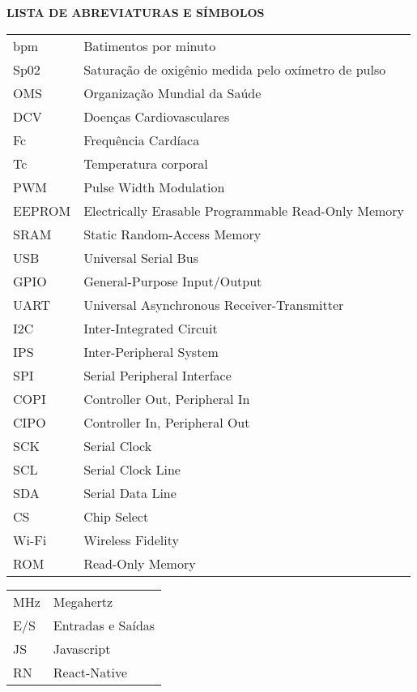 \centering \textbf{\large{LISTA DE ABREVIATURAS E SÍMBOLOS} }

\vspace{2 cm}
\justifying
\begin{tabular}{l l}
    bpm & Batimentos por minuto\\[10pt]
    Sp02 & Saturação de oxigênio medida pelo oxímetro de pulso\\[10pt]
    OMS & Organização Mundial da Saúde\\[10pt]
    DCV & Doenças Cardiovasculares\\[10pt]
    Fc & Frequência Cardíaca\\[10pt]
    Tc & Temperatura corporal\\[10pt]
    PWM & Pulse Width Modulation\\[10pt]
    EEPROM & Electrically Erasable Programmable Read-Only Memory\\[10pt]
    SRAM & Static Random-Access Memory\\[10pt]
    USB & Universal Serial Bus\\[10pt]
    GPIO & General-Purpose Input/Output\\[10pt]
    UART & Universal Asynchronous Receiver-Transmitter\\[10pt]
    I2C & Inter-Integrated Circuit\\[10pt]
    IPS & Inter-Peripheral System\\[10pt]
    SPI & Serial Peripheral Interface\\[10pt]
    COPI & Controller Out, Peripheral In\\[10pt]
    CIPO & Controller In, Peripheral Out\\[10pt]
    SCK & Serial Clock\\[10pt]
    SCL & Serial Clock Line\\[10pt]
    SDA & Serial Data Line\\[10pt]
    CS & Chip Select\\[10pt]
    Wi-Fi & Wireless Fidelity\\[10pt]
    ROM & Read-Only Memory\\[10pt]
\end{tabular}

\newpage
\begin{tabular}{l l}
    MHz & Megahertz\\[10pt]
    E/S & Entradas e Saídas\\[10pt]
    JS & Javascript\\[10pt]
    RN & React-Native\\[10pt]
\end{tabular}
           